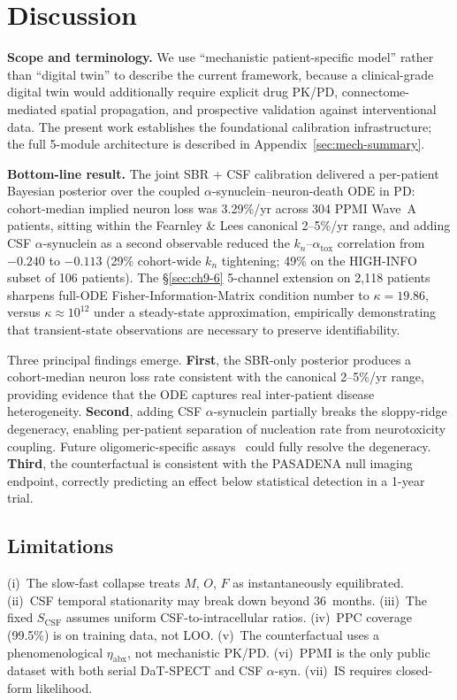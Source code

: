 \section{Discussion}
\label{sec:p7-discussion}

\textbf{Scope and terminology.} We use ``mechanistic patient-specific model'' rather than ``digital twin'' to describe the current framework, because a clinical-grade digital twin would additionally require explicit drug PK/PD, connectome-mediated spatial propagation, and prospective validation against interventional data. The present work establishes the foundational calibration infrastructure; the full 5-module architecture is described in Appendix~\ref{sec:mech-summary}.

\textbf{Bottom-line result.} The joint SBR + CSF calibration delivered a per-patient Bayesian posterior over the coupled $\alpha$-synuclein--neuron-death ODE in PD: cohort-median implied neuron loss was 3.29\%/yr across 304 PPMI Wave~A patients, sitting within the Fearnley \& Lees canonical 2--5\%/yr range, and adding CSF $\alpha$-synuclein as a second observable reduced the $k_n$--$\alpha_\text{tox}$ correlation from $-0.240$ to $-0.113$ (29\% cohort-wide $k_n$ tightening; 49\% on the HIGH-INFO subset of 106 patients). The §\ref{sec:ch9-6} 5-channel extension on 2{,}118 patients sharpens full-ODE Fisher-Information-Matrix condition number to $\kappa = 19.86$, versus $\kappa \approx 10^{12}$ under a steady-state approximation, empirically demonstrating that transient-state observations are necessary to preserve identifiability.

Three principal findings emerge. \textbf{First}, the SBR-only posterior produces a cohort-median neuron loss rate consistent with the canonical 2--5\%/yr range, providing evidence that the ODE captures real inter-patient disease heterogeneity. \textbf{Second}, adding CSF $\alpha$-synuclein partially breaks the sloppy-ridge degeneracy, enabling per-patient separation of nucleation rate from neurotoxicity coupling. Future oligomeric-specific assays~\cite{majbour2016} could fully resolve the degeneracy. \textbf{Third}, the counterfactual is consistent with the PASADENA null imaging endpoint, correctly predicting an effect below statistical detection in a 1-year trial.

\subsection{Limitations}

(i)~The slow-fast collapse treats $M$, $O$, $F$ as instantaneously equilibrated. (ii)~CSF temporal stationarity may break down beyond 36~months. (iii)~The fixed $S_\text{CSF}$ assumes uniform CSF-to-intracellular ratios. (iv)~PPC coverage (99.5\%) is on training data, not LOO. (v)~The counterfactual uses a phenomenological $\eta_\text{abx}$, not mechanistic PK/PD. (vi)~PPMI is the only public dataset with both serial DaT-SPECT and CSF $\alpha$-syn. (vii)~IS requires closed-form likelihood.

